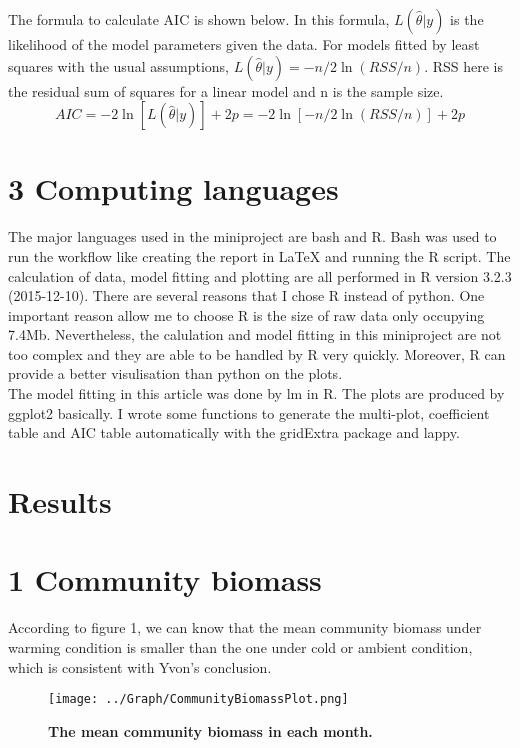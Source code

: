 \documentclass[11pt]{article}
\begin{document}
\begin{linenumbers}
The formula to calculate AIC is shown below. In this formula, $L(\hat{\theta}|y)$ is the likelihood of the model parameters given the data. For models fitted by least squares with the usual assumptions,
$L(\hat{\theta}|y)=-n/2\ln(RSS/n)$. RSS here is the residual sum of squares for a linear model and n is the sample size.
\begin{equation}
AIC = -2 \ln [ L (\hat{\theta}|y)] + 2 p = -2 \ln [-n/2\ln(RSS/n)] + 2 p
\end{equation}

\section*{3 Computing languages}
The major languages used in the miniproject are bash and R. Bash was used to run the workflow like creating the report in LaTeX and running the R script. The calculation of data, model fitting and plotting are all performed in R version 3.2.3 (2015-12-10). There are several reasons that I chose R instead of python. One important reason allow me to choose R is the size of raw data only occupying 7.4Mb. Nevertheless, the calulation and model fitting in this miniproject are not too complex and  they are able to be handled by R very quickly. Moreover, R can provide a better visulisation than python on the plots. \\
The model fitting in this article was done by lm in R. The plots are produced by ggplot2 basically. I wrote some functions to generate the multi-plot, coefficient table and AIC table automatically with the gridExtra package and lappy.

\section*{Results}
\section*{1 Community biomass}
According to figure 1, we can know that the mean community biomass under warming condition is smaller than the one under cold or ambient condition, which is consistent with Yvon's conclusion.
\begin{figure}[H]
  \centering
  \texttt{[image: ../Graph/CommunityBiomassPlot.png]}
  \caption{\textbf{The mean community biomass in each month.}  }
\end{figure}


\end{linenumbers}
\end{document}
